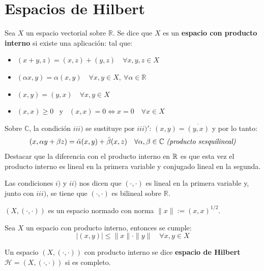 \chapter{Espacios de Hilbert}

\begin{definicion}
    Sea $X$ un espacio vectorial sobre $\mathbb{R}$. Se dice que $X$ es un \textbf{espacio con producto interno} si existe una aplicación:
    tal que:
    \begin{itemize}
        \item[i)] $(x + y, z) = (x, z) + (y, z) \quad \forall x, y, z \in X$
        \item[ii)] $(\alpha x, y) = \alpha(x, y) \quad \forall x, y \in X, \ \forall \alpha \in \mathbb{R}$
        \item[iii)] $(x, y) = (y, x) \quad \forall x, y \in X$
        \item[iv)] $(x, x) \geq0$ \ y \ $(x, x) = 0 \iff x = 0 \quad \forall x \in X$
    \end{itemize}
    Sobre $\mathbb{C}$, la condición $iii)$ se sustituye por $iii)'$: $(x, y) = \overline{(y, x)}$ y por lo tanto:
        $$(x, \alpha y + \beta z) = \bar{\alpha}(x, y) + \bar{\beta}(x, z) \quad \forall \alpha, \beta \in \mathbb{C} \text{ \textit{(producto sesquilineal)}}$$
    Destacar que la diferencia con el producto interno en $\mathbb{R}$ es que esta vez el producto interno es lineal en la primera variable y conjugado lineal en la segunda.
\end{definicion}

\begin{observacion}
    Las condiciones $i)$ y $ii)$ nos dicen que $(\cdot, \cdot)$ es lineal en la primera variable y, junto con $iii)$, se tiene que $(\cdot, \cdot)$ es bilineal sobre $\mathbb{R}$.
\end{observacion}

\begin{observacion}
    $(X, (\cdot, \cdot))$ es un espacio normado con norma $\|x\| := (x, x)^{1/2}$. \\
\end{observacion}

\begin{prop}
    Sea $X$ un espacio con producto interno, entonces se cumple:
    \[ |(x, y)| \le \|x\| \cdot \|y\| \quad \forall x, y \in X \]
\end{prop}

\begin{definicion}
    Un espacio $(X, (\cdot, \cdot))$ con producto interno se dice \textbf{espacio de Hilbert} \mbox{$\mathcal{H} = (X, (\cdot, \cdot))$} si es completo.
\end{definicion}


